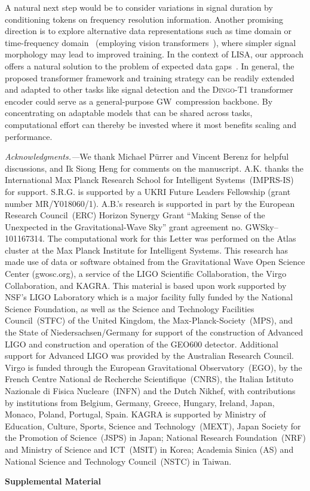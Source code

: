 \documentclass[aps,prl,twocolumn,nofootinbib,longbibliography,amsfonts,amssymb,amsmath,superscriptaddress]{revtex4-2}
\newcommand{\dingoT}{\mbox{\textsc{Dingo-T1}}\xspace}
\renewcommand{\sec}[1]{\emph{#1.---}}
\begin{document}
A natural next step would be to consider variations in signal duration by conditioning tokens on frequency resolution information. 
Another promising direction is to explore alternative data representations such as time domain or time-frequency domain~\cite{Cornish:2020odn} (employing vision transformers~\citep{dosovitskiy:2021}), where simpler signal morphology may lead to improved training. 
In the context of LISA, our approach offers a natural solution to the problem of expected data gaps~\citep{burke:2025}. 
In general, the proposed transformer framework and training strategy can be readily extended and adapted to other tasks like signal detection and the \dingoT transformer encoder could serve as a general-purpose GW~compression backbone. 
By concentrating on adaptable models that can be shared across tasks, computational effort can thereby be invested where it most benefits scaling and performance.

\begin{acknowledgments}
\sec{Acknowledgments}We thank Michael P\"urrer and Vincent Berenz for helpful discussions, and Ik Siong Heng for comments on the manuscript.
A.K. thanks the International Max Planck Research School for Intelligent Systems~(IMPRS-IS) for support. S.R.G. is supported by a UKRI Future Leaders Fellowship (grant number MR/Y018060/1).
A.B.'s research is supported in part by the European Research Council~(ERC) Horizon Synergy Grant “Making Sense of the Unexpected in the Gravitational-Wave Sky” grant agreement no. GWSky–101167314.
The computational work for this Letter was performed on the Atlas cluster at the Max Planck Institute for Intelligent Systems. 
This research has made use of data or software obtained from the Gravitational Wave Open Science Center (gwosc.org), a service of the LIGO Scientific Collaboration, the Virgo Collaboration, and KAGRA. This material is based upon work supported by NSF's LIGO Laboratory which is a major facility fully funded by the National Science Foundation, as well as the Science and Technology Facilities Council~(STFC) of the United Kingdom, the Max-Planck-Society~(MPS), and the State of Niedersachsen/Germany for support of the construction of Advanced LIGO and construction and operation of the GEO600 detector. Additional support for Advanced LIGO was provided by the Australian Research Council. Virgo is funded through the European Gravitational Observatory~(EGO), by the French Centre National de Recherche Scientifique~(CNRS), the Italian Istituto Nazionale di Fisica Nucleare~(INFN) and the Dutch Nikhef, with contributions by institutions from Belgium, Germany, Greece, Hungary, Ireland, Japan, Monaco, Poland, Portugal, Spain. KAGRA is supported by Ministry of Education, Culture, Sports, Science and Technology~(MEXT), Japan Society for the Promotion of Science~(JSPS) in Japan; National Research Foundation~(NRF) and Ministry of Science and ICT~(MSIT) in Korea; Academia Sinica (AS) and National Science and Technology Council~(NSTC) in Taiwan.
\end{acknowledgments}



\clearpage
\begin{center}
  \large
  \textbf{Supplemental Material}
\end{center}

\end{document}
